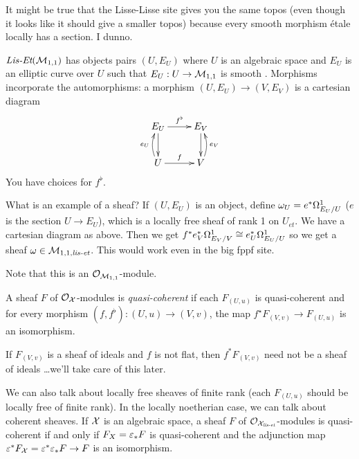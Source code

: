 It might be true that the Lisse-Lisse site gives you the same topos
(even though it looks like it should give a smaller topos) because
every smooth morphism \'etale locally has a section. I dunno.

\begin{example}
  $\text{\it Lis-Et}(\mathcal{M}_{1,1})$ has objects pairs $(U,E_U)$ where $U$ is an
algebraic space and $E_U$ is an elliptic curve over $U$ such that
$E_U:U\to \mathcal{M}_{1,1}$ is smooth . Morphisms incorporate the automorphisms: a morphism
$(U,E_U)\to (V,E_V)$ is a cartesian diagram
  \[\xymatrix{
   E_U\ar[d]\ar[r]^{f^\flat} & E_V\ar[d]\\
   U\ar[r]^f \ar@/^/[u]^{e_U} & V \ar@/_/[u]_{e_V}
  }\]
  You have choices for $f^\flat$.

  What is an example of a sheaf? If $(U,E_U)$ is an object, define
$\omega_U=e^*\Omega^1_{E_U/U}$ ($e$ is the section $U\to E_U$), which is a
locally free sheaf of rank 1 on $U_{et}$. We have a cartesian diagram
as above. Then we get $f^*e_V^*\Omega^1_{E_V/V}\cong e_U^*\Omega^1_{E_U/U}$
 so we get a sheaf $\omega\in
\mathcal{M}_{1,1,\text{\it lis-et}}$. This would work even in the big fppf site.

  Note that this is an $\mathcal{O}_{\mathcal{M}_{1,1}}$-module.
\end{example}
\begin{definition}
  A sheaf $F$ of $\mathcal{O}_{\mathcal{X}}$-modules is \emph{quasi-coherent} if each
$F_{(U,u)}$ is quasi-coherent and for every morphism
$(f,f^\flat):(U,u)\to (V,v)$, the map $f^\star F_{(V,v)}\to
F_{(U,u)}$ is an isomorphism.
\end{definition}
If $F_{(V,v)}$ is a sheaf of ideals and $f$ is not flat, then
$f^*F_{(V,v)}$ need not be a sheaf of ideals \dots we'll take care of
this later.
\begin{remark}
  We can also talk about locally free sheaves of finite rank (each
$F_{(U,u)}$ should be locally free of finite rank). In the locally
noetherian case, we can talk about coherent sheaves. If $\mathcal{X}$ is an
algebraic space, a sheaf $F$ of $\mathcal{O}_{\mathcal{X}_{\text{\it lis-et}} }$-modules is
quasi-coherent if and only if $F_X=\varepsilon_*F$ is quasi-coherent and the
adjunction map $\varepsilon^*F_{\mathcal{X}}=\varepsilon^*\varepsilon_*F\to F$ is an isomorphism.
\end{remark}
